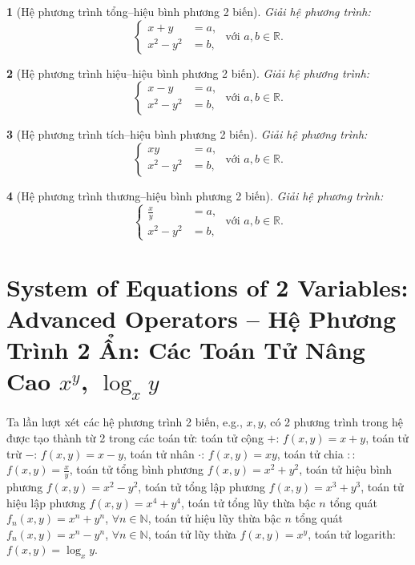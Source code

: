 \documentclass{article}
\newtheorem{baitoan}{}
\begin{document}
\begin{baitoan}[Hệ phương trình tổng--hiệu bình phương 2 biến]
	Giải hệ phương trình:
	\begin{equation}
		\left\{\begin{split}
			x + y &= a,\\
			x^2 - y^2 &= b,
		\end{split}\right.\mbox{ với }	a,b\in\mathbb{R}.
	\end{equation}
\end{baitoan}

\begin{baitoan}[Hệ phương trình hiệu--hiệu bình phương 2 biến]
	Giải hệ phương trình:
	\begin{equation}
		\left\{\begin{split}
			x - y &= a,\\
			x^2 - y^2 &= b,
		\end{split}\right.\mbox{ với }	a,b\in\mathbb{R}.
	\end{equation}
\end{baitoan}

\begin{baitoan}[Hệ phương trình tích--hiệu bình phương 2 biến]
	Giải hệ phương trình:
	\begin{equation}
		\left\{\begin{split}
			xy &= a,\\
			x^2 - y^2 &= b,
		\end{split}\right.\mbox{ với }	a,b\in\mathbb{R}.
	\end{equation}
\end{baitoan}

\begin{baitoan}[Hệ phương trình thương--hiệu bình phương 2 biến]
	Giải hệ phương trình:
	\begin{equation}
		\left\{\begin{split}
			\frac{x}{y} &= a,\\
			x^2 - y^2 &= b,
		\end{split}\right.\mbox{ với }	a,b\in\mathbb{R}.
	\end{equation}
\end{baitoan}

\section{System of Equations of 2 Variables: Advanced Operators -- Hệ Phương Trình 2 Ẩn: Các Toán Tử Nâng Cao $x^y$, $\log_xy$}
Ta lần lượt xét các hệ phương trình 2 biến, e.g., $x,y$, có 2 phương trình trong hệ được tạo thành từ 2 trong các toán tử: toán tử cộng $+$: $f(x,y) = x + y$, toán tử trừ $-$: $f(x,y) = x - y$, toán tử nhân $\cdot$: $f(x,y) = xy$, toán tử chia $:$: $f(x,y) = \frac{x}{y}$, toán tử tổng bình phương $f(x,y) = x^2 + y^2$, toán tử hiệu bình phương $f(x,y) = x^2 - y^2$, toán tử tổng lập phương $f(x,y) = x^3 + y^3$, toán tử hiệu lập phương $f(x,y) = x^4 + y^4$, toán tử tổng lũy thừa bậc $n$ tổng quát $f_n(x,y) = x^n + y^n$, $\forall n\in\mathbb{N}$, toán tử hiệu lũy thừa bậc $n$ tổng quát $f_n(x,y) = x^n - y^n$, $\forall n\in\mathbb{N}$, toán tử lũy thừa $f(x,y) = x^y$, toán tử logarith: $f(x,y) = \log_xy$.
\end{document}
